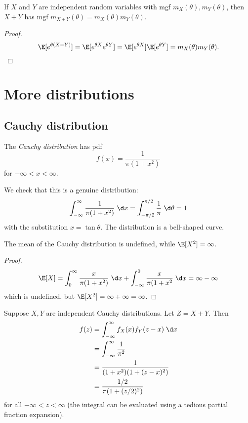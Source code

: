 \documentclass[a4paper]{article}
\begin{document}
\begin{thm}[]
  If $X$ and $Y$ are independent random variables with mgf $m_X(\theta), m_Y(\theta)$, then $X + Y$ has mgf $m_{X + Y}(\theta) = m_X(\theta)m_Y(\theta)$.
\end{thm}

\begin{proof}
  \[
    \E[e^{\theta(X + Y)}] = \E[e^{\theta X}e^{\theta Y}] = \E[e^{\theta X}]\E[e^{\theta Y}] = m_X(\theta)m_Y(\theta).
  \]
\end{proof}
\section{More distributions}
\subsection{Cauchy distribution}

\begin{defi}
  The \emph{Cauchy distribution} has pdf
  \[
    f(x) = \frac{1}{\pi(1 + x^2)}
  \]
  for $-\infty < x < \infty$.
\end{defi}
We check that this is a genuine distribution:
\[
  \int_{-\infty}^\infty \frac{1}{\pi(1 + x^2)}\;\d x = \int_{-\pi/2}^{\pi/2}\frac{1}{\pi}\;\d \theta = 1
\]
with the substitution $x = \tan \theta$. The distribution is a bell-shaped curve.

\begin{prop}
  The mean of the Cauchy distribution is undefined, while $\E[X^2] = \infty$.
\end{prop}

\begin{proof}
  \[
    \E[X] = \int_0^\infty \frac{x}{\pi(1 + x^2)}\;\d x + \int_{-\infty}^0 \frac{x}{\pi(1 + x^2}\;\d x = \infty - \infty
  \]
  which is undefined, but $\E[X^2] = \infty + \infty = \infty$.
\end{proof}

Suppose $X, Y$ are independent Cauchy distributions. Let $Z = X + Y$. Then
\begin{align*}
  f(z) &= \int_{-\infty}^\infty f_X(x)f_Y(z - x)\;\d x\\
  &= \int_{-\infty}^\infty \frac{1}{\pi^2} \\
  &= \frac{1}{(1 + x^2)(1 + (z - x)^2)}\\
  &= \frac{1/2}{\pi(1 + (z/2)^2)}
\end{align*}
for all $-\infty < z < \infty$ (the integral can be evaluated using a tedious partial fraction expansion).
\end{document}
